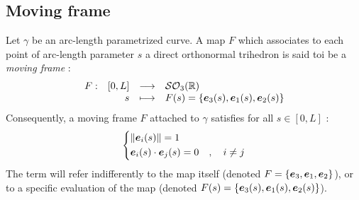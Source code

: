 \subsection{Moving frame}

Let $\gamma$ be an arc-length parametrized curve. A map $F$ which associates to each point of arc-length parameter $s$ a direct orthonormal trihedron is said toi be a \emph{moving frame} :
\begin{equation}
	\begin{array}{lrcl} F: & [0,L] & \longrightarrow & \mathcal{SO}_{3}(\mathbb{R}) \\ & s & \longmapsto & F(s) = \{\boldsymbol{e}_{3}(s),\boldsymbol{e}_{1}(s),\boldsymbol{e}_{2}(s)\} \end{array}
\end{equation}
Consequently, a moving frame $F$ attached to $\gamma$ satisfies for all $s \in [0,L]$ :
\begin{equation}
	\left\{
	\begin{aligned}
		& \| \boldsymbol{e}_i(s) \| = 1 \\
		& \boldsymbol{e}_i(s) \cdot \boldsymbol{e}_j(s) = 0\quad , \quad i \neq j
	\end{aligned}
	\right.
\end{equation}
The term  will refer indifferently to the map itself (denoted $F=\{\boldsymbol{e}_{3},\boldsymbol{e}_{1},\boldsymbol{e}_{2}\}$), or to a specific evaluation of the map (denoted $F(s)=\{\boldsymbol{e}_{3}(s),\boldsymbol{e}_{1}(s),\boldsymbol{e}_{2}(s)\}$).

